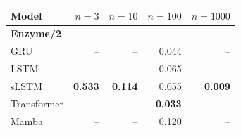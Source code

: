 \begin{tabular*}{\linewidth}{@{\extracolsep{\fill}}lrrrr}
\toprule
Model & $n=3$ & $n=10$ & $n=100$ & $n=1000$ \\
\midrule
\multicolumn{5}{l}{\textbf{Enzyme/2}} \\
GRU & -- & -- & 0.044 & -- \\
LSTM & -- & -- & 0.065 & -- \\
sLSTM & \textbf{0.533} & \textbf{0.114} & 0.055 & \textbf{0.009} \\
Transformer & -- & -- & \textbf{0.033} & -- \\
Mamba & -- & -- & 0.120 & -- \\
\bottomrule
\end{tabular*}
